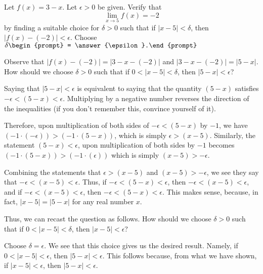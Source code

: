 \documentclass{ximera}
\author{Gregory Hartman \and Matthew Carr}
\begin{document}
\begin{exercise}



Let $f(x)=3-x$. Let $\epsilon>0$ be given. Verify that
\[
\lim_{x\to5}f(x)=-2
\]
by finding a suitable choice for $\delta>0$ such that if $\left|{x-5}\right|<\delta$, then $\left|{f(x)-({-2})}\right|<\epsilon$. Choose $\delta\begin{prompt} = \answer{\epsilon}.\end{prompt}$

 \begin{hint}
 Observe that $\left|{f(x)-({-2})}\right|=\left|{3-x-({-2})}\right|$ and $\left|{3-x-({-2})}\right|=\left|{5-x}\right|$. How should we choose $\delta>0$ such that if $0<\left|{x-5}\right|<\delta$, then $\left|{5-x}\right|<\epsilon$?
 \end{hint}
 \begin{hint}
 Saying that $\left|{5-x}\right|<\epsilon$ is equivalent to saying that the quantity $\left({5-x}\right)$ satisfies $-\epsilon<\left({5-x}\right)<\epsilon$. Multiplying by a negative number reverses the direction of the inequalities (if you don't remember this, convince yourself of it).
 
 Therefore, upon multiplication of both sides of $-\epsilon<\left({5-x}\right)$ by $-1$, we have $\left({-1\cdot\left({-\epsilon}\right)}\right)>\left({-1\cdot\left({5-x}\right)}\right)$, which is simply $\epsilon>\left({x-5}\right)$. Similarly, the statement $\left({5-x}\right)<\epsilon$, upon multiplication of both sides by $-1$ becomes $\left({-1\cdot\left({5-x}\right)}\right)>\left({-1\cdot\left({\epsilon}\right)}\right)$ which is simply $\left({x-5}\right)>-\epsilon$.
 \end{hint}
 \begin{hint}
 Combining the statements that $\epsilon>\left({x-5}\right)$ and $\left({x-5}\right)>-\epsilon$, we see they say that $-\epsilon<\left({x-5}\right)<\epsilon$. Thus, if $-\epsilon<\left({5-x}\right)<\epsilon$, then $-\epsilon<\left({x-5}\right)<\epsilon$, and if $-\epsilon<\left({x-5}\right)<\epsilon$, then $-\epsilon<\left({5-x}\right)<\epsilon$. This makes sense, because, in fact, $\left|{x-5}\right|=\left|{5-x}\right|$ for any real number $x$. 
 
 Thus, we can recast the question as follows. How should we choose $\delta>0$ such that if $0<\left|{x-5}\right|<\delta$, then $\left|{x-5}\right|<\epsilon$?
 \end{hint}
 \begin{hint}
 Choose $\delta=\epsilon$. We see that this choice gives us the desired result. Namely, if $0<\left|{x-5}\right|<\epsilon$, then $\left|{5-x}\right|<\epsilon$. This follows because, from what we have shown, if $\left|{x-5}\right|<\epsilon$, then $\left|{5-x}\right|<\epsilon$.
 \end{hint}
\end{exercise}
\end{document}

